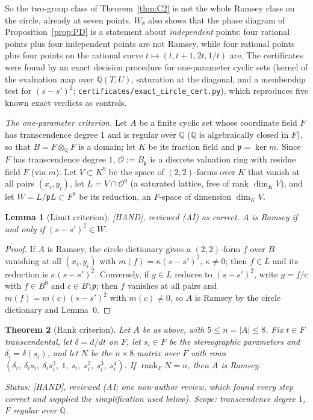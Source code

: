 \documentclass[11pt]{amsart}
\newcommand{\st}[1]{\textsf{[#1]}}
\newcommand{\Q}{\mathbb{Q}}
\theoremstyle{plain}
\newtheorem{theorem}{Theorem}[section]
\newtheorem{lemma}[theorem]{Lemma}
\theoremstyle{definition}
\begin{document}
\noindent So the two-group class of Theorem~\ref{thm:C2} is not the whole Ramsey class on the circle,
already at seven points. $W_8$ also shows that the phase diagram of Proposition~\ref{prop:PD} is a
statement about \emph{independent} points: four rational points plus four independent points are not
Ramsey, while four rational points plus four points on the rational curve $t\mapsto(t,t+1,2t,1/t)$ are.
The certificates were found by an exact decision procedure for one-parameter cyclic sets (kernel of the
evaluation map over $\Q(T,U)$, saturation at the diagonal, and a membership test for $(s-s')^2$;
\texttt{certificates/exact\_circle\_cert.py}), which reproduces five known exact verdicts as controls.

\medskip
\noindent\emph{The one-parameter criterion.} Let $A$ be a finite cyclic set whose coordinate field $F$ has
transcendence degree $1$ and is regular over $\Q$ ($\Q$ is algebraically closed in $F$), so that $B=F\otimes_\Q F$
is a domain; let $K$ be its fraction field and $\mathfrak p=\ker m$. Since $F$ has transcendence degree $1$,
$\mathcal O:=B_{\mathfrak p}$ is a discrete valuation ring with residue field $F$ (via $m$). Let
$V\subset K^9$ be the space of $(2,2)$-forms over $K$ that vanish at all pairs $(x_i,y_i)$, let
$L=V\cap\mathcal O^9$ (a saturated lattice, free of rank $\dim_KV$), and let $W=L/\mathfrak pL\subset F^9$ be its
reduction, an $F$-space of dimension $\dim_KV$.

\begin{lemma}[Limit criterion]\label{lem:limit}
\st{HAND}, reviewed (AI) as correct. $A$ is Ramsey if and only if $(s-s')^2\in W$.
\end{lemma}

\begin{proof}
If $A$ is Ramsey, the circle dictionary gives a $(2,2)$-form $f$ over $B$ vanishing at all $(x_i,y_i)$ with
$m(f)=\kappa(s-s')^2$, $\kappa\ne0$; then $f\in L$ and its reduction is $\kappa(s-s')^2$. Conversely, if
$g\in L$ reduces to $(s-s')^2$, write $g=f/c$ with $f\in B^9$ and $c\in B\setminus\mathfrak p$; then $f$
vanishes at all pairs and $m(f)=m(c)(s-s')^2$ with $m(c)\ne0$, so $A$ is Ramsey by the circle dictionary
and Lemma~0.
\end{proof}

\begin{theorem}[Rank criterion]\label{thm:rank}
Let $A$ be as above, with $5\le n=|A|\le8$. Fix $t\in F$ transcendental, let $\delta=d/dt$ on $F$, let
$s_i\in F$ be the stereographic parameters and $\delta_i=\delta(s_i)$, and let $N$ be the $n\times8$
matrix over $F$ with rows $(\delta_i,\ \delta_is_i,\ \delta_is_i^2,\ 1,\ s_i,\ s_i^2,\ s_i^3,\ s_i^4)$. If
$\operatorname{rank}_FN=n$, then $A$ is Ramsey.

\smallskip\noindent\emph{Status:} \st{HAND}, reviewed (AI; one non-author review, which found every step
correct and supplied the simplification used below). Scope: transcendence degree $1$, $F$ regular over
$\Q$.
\end{theorem}
\end{document}
